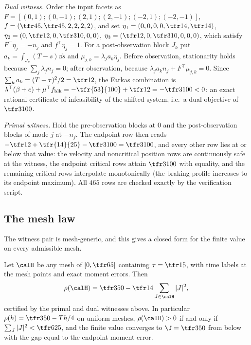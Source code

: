 \emph{Dual witness.} Order the input facets as $F=[(0,1);(0,-1);(2,1);(2,-1);(-2,1);(-2,-1)]$, $f=(\tfr45,\tfr45,2,2,2,2)$, and set $\eta_1=(0,0,0,0,\tfr14,\tfr14)$, $\eta_2=(0,\tfr12,0,\tfr3{10},0,0)$, $\eta_3=(\tfr12,0,\tfr3{10},0,0,0)$, which satisfy $F^\top\eta_j=-n_j$ and $f^\top\eta_j=1$. For a post-observation block $J_k$ put $a_k=\int_{J_k}(T-s)\dd s$ and $\mu_{j,k}=\lambda_ja_k\eta_j$. Before observation, stationarity holds because $\sum_j\lambda_jn_j=0$; after observation, because $\lambda_ja_kn_j+F^\top\mu_{j,k}=0$. Since $\sum_ka_k=(T-\tau)^2/2=\tfr12$, the Farkas combination is $\lambda^\top(\beta+e)+\mu^\top f_{\mathrm{blk}}=-\tfr{53}{100}+\tfr12=-\tfr3{100}<0$: an exact rational certificate of infeasibility of the shifted system, i.e.\ a dual objective of $\tfr3{100}$.

\emph{Primal witness.} Hold the pre-observation blocks at $0$ and the post-observation blocks of mode $j$ at $-n_j$. The endpoint row then reads $-\tfr12+\tfr{14}{25}-\tfr3{100}=\tfr3{100}$, and every other row lies at or below that value: the velocity and noncritical position rows are continuously safe at the witness, the endpoint critical rows attain $\tfr3{100}$ with equality, and the remaining critical rows interpolate monotonically (the braking profile increases to its endpoint maximum). All $465$ rows are checked exactly by the verification script.

\subsection{The mesh law}

The witness pair is mesh-generic, and this gives a closed form for the finite value on every admissible mesh.

\begin{proposition}\label{prop:meshlaw}
Let $\calH$ be any mesh of $[0,\tfr65]$ containing $\tau=\tfr15$, with time labels at the mesh points and exact moment errors. Then
\begin{equation}\label{eq:meshlaw}
\rho(\calH)=\tfr3{50}-\tfr14\sum_{J\in\calH}|J|^2 ,
\end{equation}
certified by the primal and dual witnesses above. In particular $\rho(h)=\tfr3{50}-Th/4$ on uniform meshes, $\rho(\calH)>0$ if and only if $\sum_J|J|^2<\tfr6{25}$, and the finite value converges to $\J=\tfr3{50}$ from below with the gap equal to the endpoint moment error.
\end{proposition}


